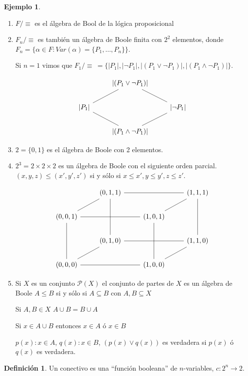 \documentclass[a4paper,11pt]{article}
\theoremstyle{definition}
\newtheorem{defn}{Definición}[section]
\newtheorem{exap}{Ejemplo}[section]
\theoremstyle{remark}
\begin{document}
\begin{exap}
\begin{enumerate}
\item $F/\equiv$ es el álgebra de Bool de la lógica proposicional
\item $F_n/\equiv$ es también un álgebra de Boole finita con $2^{2}$ elementos, donde 
$F_n = \{\alpha \in F : Var(\alpha) = \{ P_1, \dots, P_n\} \}$.

Si $n=1$ vimos que $F_1/\equiv\ = \{|P_1|, |\neg P_1|, |(P_1 \vee \neg P_1)|, 
|(P_1 \wedge \neg P_1)|\}$.

\[
\begin{tikzcd}
& \left|(P_1 \vee \neg P_1)\right| \arrow[dl, dash]\arrow[dr, dash] & \\
\left|P_1\right| \arrow[dr, dash] & & \left|\neg P_1\right| \arrow[dl, dash] \\
& \left|(P_1 \wedge \neg P_1)\right|
\end{tikzcd}
\]
\item $2 = \{0, 1\}$ es el álgebra de Boole con 2 elementos.
\item $2^3 = 2 \times 2 \times 2$ es un álgebra de Boole con el siguiente orden parcial.
$(x, y , z) \leq (x', y', z')$ si y sólo si $x \leq x', y \leq y', z \leq z'$.

\[
\begin{tikzcd}
& (0, 1, 1) \arrow[dl, dash] \arrow[rr, dash] \arrow[dd, dash] & & (1, 1, 1) \arrow[dl, dash] \arrow[dd, dash] \\
(0, 0, 1) \arrow[dd, dash] \arrow[rr, dash] & & (1, 0, 1) \arrow[dd, dash] \\
& (0, 1, 0) \arrow[dl, dash] \arrow[rr, dash] & & (1, 1, 0) \arrow[dl, dash] \\
(0, 0, 0) \arrow[rr, dash] & & (1, 0, 0) 
\end{tikzcd}
\]
\item Si $X$ es un conjunto $\mathcal P(X)$ el conjunto de partes de $X$ es un álgebra de Boole
$A \leq B$ si y sólo si $A \subseteq B$ con $A, B \subseteq X$

Si $A, B \in X$ $A \cup B = B \cup A$

Si $x \in A \cup B$ entonces $x \in A$ ó $x \in B$

$p(x) : x \in A$, $q(x) : x \in B$, $(p(x) \vee q(x))$ es verdadera si $p(x)$ ó $q(x)$ es verdadera.
\end{enumerate}
\end{exap}

\begin{defn}
Un conectivo es una ``función booleana'' de $n$-variables, $c : 2^n \to 2$.
\end{defn}
\end{document}
